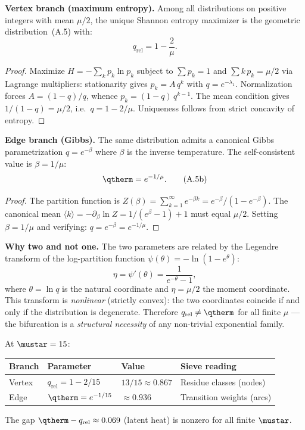 \documentclass[12pt,a4paper]{article}
\providecommand{\qrel}{\ensuremath{q_{\mathrm{rel}}}}
\begin{document}
\begin{theorembox}

\textbf{Vertex branch (maximum entropy).}
Among all distributions on positive integers with mean $\mu/2$, the
unique Shannon entropy maximizer is the geometric distribution~(A.5)
with:
\begin{equation}
  \qrel = 1 - \frac{2}{\mu}.
  \tag{A.5a}
\end{equation}

\begin{proof}
Maximize $H = -\sum_k p_k \ln p_k$ subject to $\sum p_k = 1$ and
$\sum k\,p_k = \mu/2$ via Lagrange multipliers: stationarity gives
$p_k = A\,q^k$ with $q = e^{-\lambda_1}$. Normalization forces
$A = (1-q)/q$, whence $p_k = (1-q)\,q^{k-1}$. The mean condition
gives $1/(1-q) = \mu/2$, i.e.\ $q = 1 - 2/\mu$. Uniqueness follows
from strict concavity of entropy.
\end{proof}

\textbf{Edge branch (Gibbs).}
The same distribution admits a canonical Gibbs parametrization
$q = e^{-\beta}$ where $\beta$ is the inverse temperature. The
self-consistent value is $\beta = 1/\mu$:
\begin{equation}
  \qtherm = e^{-1/\mu}.
  \tag{A.5b}
\end{equation}

\begin{proof}
The partition function is
$Z(\beta) = \sum_{k=1}^{\infty} e^{-\beta k} = e^{-\beta}/(1-e^{-\beta})$.
The canonical mean $\langle k \rangle = -\partial_\beta \ln Z = 1/(e^\beta - 1) + 1$
must equal $\mu/2$. Setting $\beta = 1/\mu$ and verifying:
$q = e^{-\beta} = e^{-1/\mu}$.
\end{proof}

\textbf{Why two and not one.}
The two parameters are related by the Legendre transform of the
log-partition function $\psi(\theta) = -\ln(1-e^\theta)$:
\[
  \eta = \psi'(\theta) = \frac{1}{e^{-\theta} - 1},
\]
where $\theta = \ln q$ is the natural coordinate and $\eta = \mu/2$
the moment coordinate. This transform is \emph{nonlinear} (strictly
convex): the two coordinates coincide if and only if the distribution
is degenerate. Therefore $\qrel \neq \qtherm$ for all finite
$\mu$ --- the bifurcation is a \emph{structural necessity} of any
non-trivial exponential family.
\end{theorembox}

At $\mustar = 15$:
\begin{center}
\begin{tabular}{llll}
\toprule
\textbf{Branch} & \textbf{Parameter} & \textbf{Value} & \textbf{Sieve reading} \\
\midrule
Vertex & $\qrel = 1 - 2/15$ & $13/15 \approx 0.867$ & Residue classes (nodes) \\
Edge & $\qtherm = e^{-1/15}$ & $\approx 0.936$ & Transition weights (arcs) \\
\bottomrule
\end{tabular}
\end{center}
The gap $\qtherm - \qrel \approx 0.069$ (latent heat) is nonzero for
all finite $\mustar$.
\end{document}
